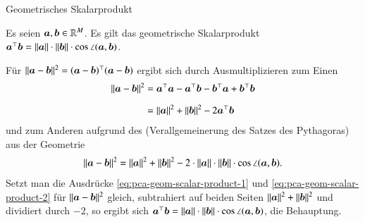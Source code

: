 \begin{frame}{Geometrisches Skalarprodukt}{}
	\begin{mytheo}
		Es seien $\bm{a}, \bm{b} \in \mathbb{R}^M$. Es gilt das geometrische Skalarprodukt
		$\bm{a}^\top \bm{b} = \Vert \bm{a} \Vert \cdot \Vert \bm{b} \Vert \cdot \cos \angle(\bm{a}, \bm{b})$.
	\end{mytheo}

	\begin{myproof}
		Für $\Vert \bm{a} - \bm{b} \Vert^2 = (\bm{a} - \bm{b})^\top (\bm{a} - \bm{b})$ ergibt sich durch Ausmultiplizieren zum Einen
		\begin{equation} \label{eq:pca-geom-scalar-product-1}
			\begin{aligned}
				\Vert \bm{a} - \bm{b} \Vert^2
					&= \bm{a}^\top \bm{a} - \bm{a}^\top \bm{b} - \bm{b}^\top \bm{a} + \bm{b}^\top \bm{b}
			\\[2mm]
					&= \Vert \bm{a} \Vert^2 + \Vert \bm{b} \Vert^2 - 2 \bm{a}^\top \bm{b}
			\end{aligned}
		\end{equation}
		und zum Anderen aufgrund des  (Verallgemeinerung des Satzes des Pythagoras) aus der Geometrie
		\begin{equation} \label{eq:pca-geom-scalar-product-2}
			\Vert \bm{a} - \bm{b} \Vert^2
				= \Vert \bm{a} \Vert^2 + \Vert \bm{b} \Vert^2
				- 2 \cdot \Vert \bm{a} \Vert \cdot \Vert \bm{b} \Vert \cdot \cos \angle(\bm{a}, \bm{b}).
		\end{equation}
		Setzt man die Ausdrücke \eqref{eq:pca-geom-scalar-product-1} und \eqref{eq:pca-geom-scalar-product-2} für
		$\Vert \bm{a} - \bm{b} \Vert^2$ gleich, subtrahiert auf beiden Seiten $\Vert \bm{a} \Vert^2 + \Vert \bm{b} \Vert^2$ und
		dividiert durch $-2$, so ergibt sich $\bm{a}^\top \bm{b} = \Vert \bm{a} \Vert \cdot \Vert \bm{b} \Vert \cdot \cos \angle(\bm{a}, \bm{b})$, die Behauptung.
	\end{myproof}
\end{frame}


